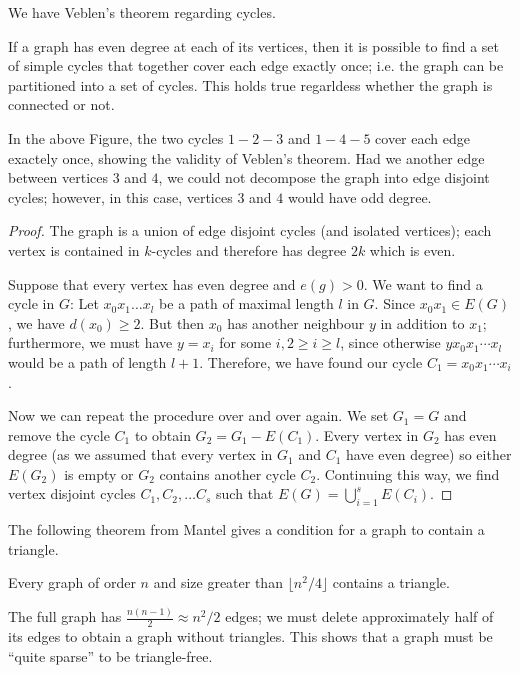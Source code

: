We have Veblen's theorem regarding cycles.

\begin{theorem}
If a graph has even degree at each of its vertices, then it is possible to find a set of simple cycles that together cover each edge exactly once; i.e. the graph can be partitioned into a set of cycles. This holds true regarldess whether the graph is connected or not.
\end{theorem}

In the above Figure, the two cycles $1-2-3$ and $1-4-5$ cover each edge exactely once, showing the validity of Veblen's theorem. Had we another edge between vertices $3$ and $4$, we could not decompose the graph into edge disjoint cycles; however, in this case, vertices $3$ and $4$ would have odd degree.

\begin{proof}
  The graph is a union of edge disjoint cycles (and isolated vertices); each vertex is contained in $k$-cycles and therefore has degree $2k$ which is even.

  Suppose that every vertex has even degree and $e(g) > 0$. We want to find a cycle in $G$: Let $x_0 x_1 \ldots x_l$ be a path of maximal length $l$ in $G$. Since $x_0 x_1 \in E(G)$, we have $d(x_0) \geq 2$. But then $x_0$ has another neighbour $y$ in addition to $x_1$; furthermore, we must have $y=x_i$ for some $i, 2 \geq i \geq l$, since otherwise $y x_0 x_1 \cdots x_l$ would be a path of length $l+1$. Therefore, we have found our cycle $C_1 = x_0 x_1 \cdots x_i$.

  Now we can repeat the procedure over and over again. We set $G_1 = G$ and remove the cycle $C_1$ to obtain $G_2 = G_1 - E(C_1)$. Every vertex in $G_2$ has even degree (as we assumed that every vertex in $G_1$ and $C_1$ have even degree) so either $E(G_2)$ is empty or $G_2$ contains another cycle $C_2$. Continuing this way, we find vertex disjoint cycles $C_1, C_2, \ldots C_s$ such that $E(G) = \bigcup_{i=1}^s E(C_i)$.
\end{proof}

The following theorem from Mantel gives a condition for a graph to contain a triangle.

\begin{theorem}
  Every graph of order $n$ and size greater than $\lfloor n^2/4 \rfloor$ contains a triangle.
\end{theorem}

The full graph has $\frac{n(n-1)}{2} \approx n^2 / 2$ edges; we must delete approximately half of its edges to obtain a graph without triangles. This shows that a graph must be ``quite sparse'' to be triangle-free.

